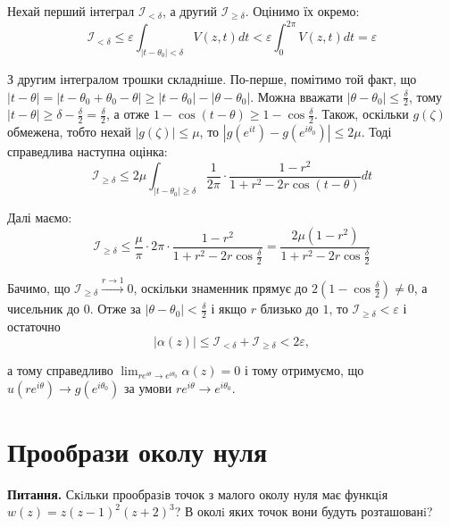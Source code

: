 \documentclass[14pt]{extarticle}
\newcommand{\<}{\langle}
\renewcommand{\>}{\rangle}
\theoremstyle{mystyle}{\newtheorem{definition}{Definition}[section]}
\theoremstyle{mystyle}{\newtheorem{proposition}[definition]{Proposition}}
\theoremstyle{mystyle}{\newtheorem{theorem}[definition]{Theorem}}
\theoremstyle{mystyle}{\newtheorem{lemma}[definition]{Lemma}}
\theoremstyle{mystyle}{\newtheorem{corollary}[definition]{Corollary}}
\theoremstyle{mystyle}{\newtheorem*{remark}{Remark}}
\theoremstyle{mystyle}{\newtheorem*{remarks}{Remarks}}
\theoremstyle{mystyle}{\newtheorem*{example}{Example}}
\theoremstyle{mystyle}{\newtheorem*{examples}{Examples}}
\theoremstyle{definition}{\newtheorem*{exercise}{Exercise}}
\theoremstyle{cstyle}{\newtheorem*{cthm}{}}
\theoremstyle{warn}
\begin{document}
Нехай перший інтеграл $\mathcal{I}_{<\delta}$, а другий $\mathcal{I}_{\geq\delta}$. Оцінимо їх окремо:
\begin{equation}
    \mathcal{I}_{<\delta} \leq \varepsilon \int_{|t-\theta_0|<\delta} V(z,t)dt < \varepsilon \int_0^{2\pi}V(z,t)dt = \varepsilon
\end{equation}

З другим інтегралом трошки складніше. По-перше, помітимо той факт, що $|t-\theta|=|t-\theta_0+\theta_0-\theta| \geq |t-\theta_0|-|\theta-\theta_0|$. Можна вважати $|\theta-\theta_0| \leq \frac{\delta}{2}$, тому $|t-\theta| \geq \delta - \frac{\delta}{2}=\frac{\delta}{2}$, а отже $1-\cos(t-\theta)\geq 1 - \cos \frac{\delta}{2}$. Також, оскільки $g(\zeta)$ обмежена, тобто нехай $|g(\zeta)| \leq \mu$, то  $|g(e^{it})-g(e^{i\theta_0})| \leq 2\mu$. Тоді справедлива наступна оцінка:
\begin{equation}
    \mathcal{I}_{\geq\delta} \leq 2\mu \int_{|t-\theta_0|\geq\delta}\frac{1}{2\pi}\cdot\frac{1-r^2}{1+r^2-2r\cos(t-\theta)}dt
\end{equation}

Далі маємо:
\begin{equation}
    \mathcal{I}_{\geq\delta} \leq \frac{\mu}{\pi} \cdot 2\pi \cdot \frac{1-r^2}{1+r^2-2r\cos\frac{\delta}{2}} = \frac{2\mu(1-r^2)}{1+r^2-2r\cos\frac{\delta}{2}}
\end{equation}

Бачимо, що $\mathcal{I}_{\geq \delta} \xrightarrow[]{r \to 1} 0$, оскільки знаменник прямує до $2(1-\cos\frac{\delta}{2}) \neq 0$, а чисельник до $0$. Отже за $|\theta-\theta_0| < \frac{\delta}{2}$ і якщо $r$ близько до $1$, то $\mathcal{I}_{\geq\delta} < \varepsilon$ і остаточно
\begin{equation}
    |\alpha(z)| \leq \mathcal{I}_{<\delta} + \mathcal{I}_{\geq\delta} < 2\varepsilon,
\end{equation}

а тому справедливо $\lim_{re^{i\theta} \to e^{i\theta_0}}\alpha(z)=0$ і тому отримуємо, що $u(re^{i\theta})\to g(e^{i\theta_0})$ за умови $re^{i\theta} \to e^{i\theta_0}$.

\section{Прообрази околу нуля}

\textbf{Питання.} Скiльки прообразiв точок з малого околу нуля має функцiя $w(z) = z(z-1)^2(z+2)^3$? В околi яких точок вони будуть розташованi?
\end{document}
